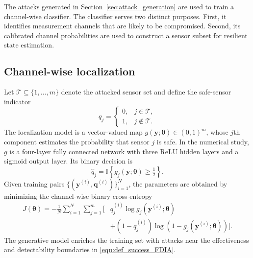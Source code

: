 The attacks generated in Section~\ref{sec:attack_generation} are used to train a channel-wise classifier. The classifier serves two distinct purposes. First, it identifies measurement channels that are likely to be compromised. Second, its calibrated channel probabilities are used to construct a sensor subset for resilient state estimation.

\subsection{Channel-wise localization}
Let $\mathcal{T}\subseteq\{1,\ldots,m\}$ denote the attacked sensor set and define the safe-sensor indicator
\begin{equation}\label{equ:support}
q_j=\begin{cases}
0,&j\in\mathcal{T},\\
1,&j\notin\mathcal{T}.
\end{cases}
\end{equation}
The localization model is a vector-valued map
$g(\mathbf{y};\boldsymbol{\theta})\in(0,1)^m$, whose $j$th component estimates the probability that sensor $j$ is safe. In the numerical study, $g$ is a four-layer fully connected network with three ReLU hidden layers and a sigmoid output layer. Its binary decision is
\begin{equation}\label{equ:classification}
\hat q_j=\mathbb{I}\!\left\{g_j(\mathbf{y};\boldsymbol{\theta})\ge\tfrac12\right\}.
\end{equation}
Given training pairs $\{(\mathbf{y}^{(i)},\mathbf{q}^{(i)})\}_{i=1}^N$, the parameters are obtained by minimizing the channel-wise binary cross-entropy
\begin{align}\label{equ:MLP_loss}
J(\boldsymbol{\theta})=-\frac{1}{N}\sum_{i=1}^{N}\sum_{j=1}^{m}
\big[&
q_j^{(i)}\log g_j(\mathbf{y}^{(i)};\boldsymbol{\theta})\nonumber\\
&+(1-q_j^{(i)})\log(1-g_j(\mathbf{y}^{(i)};\boldsymbol{\theta}))
\big].
\end{align}
The generative model enriches the training set with attacks near the effectiveness and detectability boundaries in \eqref{equ:def_success_FDIA}.

